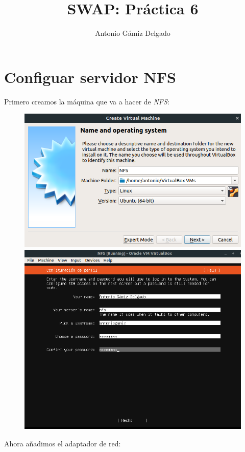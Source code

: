 \documentclass[12pt]{article}
\title{SWAP: Práctica 6}
\author{
        Antonio Gámiz Delgado
}
\begin{document}
\maketitle

\section{Configuar servidor NFS}

Primero creamos la máquina que va a hacer de \textit{NFS}:

\begin{figure}[H]
\center
\includegraphics[scale=0.4]{1.png}
\includegraphics[scale=0.3]{2.png}
\end{figure}

Ahora añadimos el adaptador de red:
\end{document}
